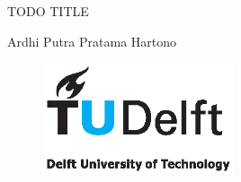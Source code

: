 \begin{titlepage}

\null\vfill

\begin{center}
\LARGE{TODO TITLE}
\end{center}

\vspace{1.5cm}

\begin{center}
Ardhi Putra Pratama Hartono
\end{center}

\vfill

\begin{figure}[!b]
\centering
\includegraphics[width={0.5\textwidth}]{pics/TUDlogocolor}
\end{figure}
\vspace{2.0cm}

\end{titlepage}

